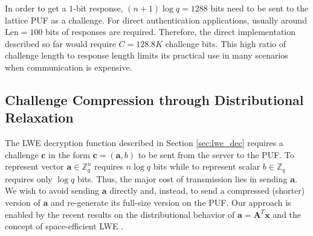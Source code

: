 In order to get a $1$-bit response, $(n+1)\log q = 1288$ bits need to be sent to the lattice PUF as a challenge.
For direct authentication applications, usually around $\text{Len}=100$ bits of responses are required. Therefore, the direct implementation described so far would require $C = 128.8K$ challenge bits.
This high ratio of challenge length to response length limits its practical use in many scenarios when communication is expensive.



\vspace{-0.5em}
\subsection{Challenge Compression through Distributional Relaxation}
\label{sec:lfsr}
The LWE decryption function described in Section \ref{sec:lwe_dec} requires a challenge $\mathbf{c}$ in the form $\mathbf{c}=(\mathbf{a},b)$ to be sent from the server to the PUF. 
To represent vector $\mathbf{a} \in \mathbb{Z}_q^n$ requires $n\log q$ bits while to represent scalar $b \in \mathbb{Z}_q$  requires only $\log q$ bits. 
Thus, the major cost of transmission lies in sending $\mathbf{a}$. 
We wish to avoid sending $\mathbf{a}$ directly and, instead, to send a compressed (shorter) version of $\mathbf{a}$  and re-generate its full-size version on the PUF.
Our approach is enabled by the recent results on the distributional behavior of $\mathbf{a}=\mathbf{A}^T\mathbf{x}$ \cite{akavia2009simultaneous} and the concept of space-efficient LWE \cite{galbraith2013space}.

